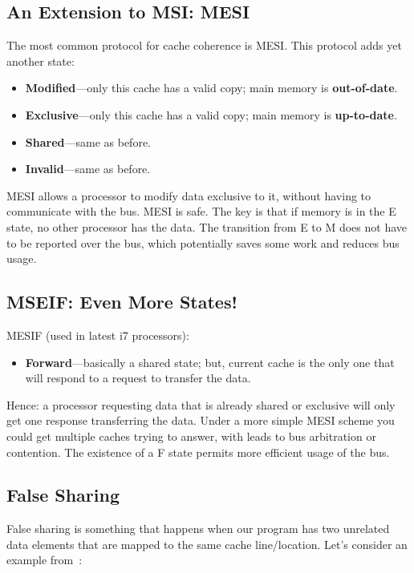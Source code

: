 \documentclass[a4paper]{report}
\begin{document}
\subsection*{An Extension to MSI: MESI}
    The most common protocol for cache coherence is MESI.
    This protocol adds yet another state:
      \begin{itemize}
        \item {\bf Modified}---only this cache has a valid copy; 
 main memory is {\bf out-of-date}.
        \item {\bf Exclusive}---only this cache has a valid copy; 
 main memory is {\bf up-to-date}.
        \item {\bf Shared}---same as before.
        \item {\bf Invalid}---same as before.
      \end{itemize}

    MESI allows a processor to modify data exclusive to it, without
    having to communicate with the bus.  MESI is safe. The key is that
    if memory is in the E state, no other processor has the data. The transition from E to M does not have to be reported over the bus, which potentially saves some work and reduces bus usage. 

\subsection*{MSEIF: Even More States!}

    MESIF (used in latest i7 processors):
      \begin{itemize}
        \item {\bf Forward}---basically a shared state; but, current
          cache is the only one that will respond to a request to
          transfer the data.
      \end{itemize}

    Hence: a processor requesting data that is already shared or exclusive will
      only get one response transferring the data. Under a more simple MESI scheme you could get multiple caches trying to answer, with leads to bus arbitration or contention. The existence of a F state permits more efficient usage of the bus.
      
      
\subsection*{False Sharing}
False sharing is something that happens when our program has two unrelated data elements that are mapped to the same cache line/location. Let's consider an example from~\cite{falsesharing}:
\end{document}
